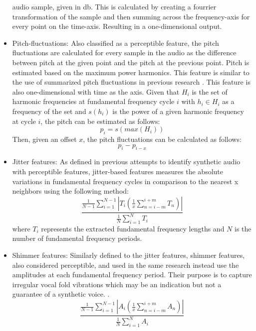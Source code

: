 \documentclass{article}
\begin{document}
\begin{itemize}
					audio sample, given in db. This is calculated by creating a fourrier
					transformation of the sample and then summing across the frequency-axis for
					every point on the time-axis. Resulting in a one-dimensional output.
				\item
					Pitch-fluctuations: Also classified as a perceptible feature, the pitch
					fluctuations are calculated for every sample in the audio as the difference
					between pitch at the given point and the pitch at the previous point. Pitch is
					estimated based on the maximum power harmonics. This feature is similar to the
					use of summarized pitch fluctuations in previous research
					\cite{khanjani_learning_2023}. This feature is also one-dimensional with time
					as the axis. Given that \(H_{i}\) is the set of harmonic frequencies at
					fundamental frequency cycle \(i\) with \(h_{i} \in H_{i}\) as a frequency of
					the set and \(s(h_{i})\) is the power of a given harmonic frequency at cycle
					\(i\), the pitch can be estimated as follows:
					\[p_{i} = s(max(H_{i}))\]
					Then, given an offset \(x\), the pitch fluctuations can be calculated as
					follows:
					\[p_{i}-p_{i-x}\]
				\item
					Jitter features: As defined in previous attempts to identify synthetic audio
					\cite{chaiwongyen_deepfake-speech_2023} with perceptible features,
					jitter-based features measures the absolute variations in fundamental
					frequency cycles in comparison to the nearest x neighbors using the following
					method:
					\[ \frac{ \frac{1}{N-1}\sum_{i=1}^{N-1}|T_{i}
						(\frac{1}{x}\sum_{n=i-m}^{i+m}T_{n})|}
					{\frac{1}{N}\sum_{i=1}^{N}T_{i}} \]
					where \(T_{i}\) represents the extracted fundamental frequency lengths and
					\(N\) is the number of fundamental frequency periods.
				\item
					Shimmer features: Similarly defined to the jitter features, shimmer features,
					also considered perceptible, and used in the same research instead use the
					amplitudes at each fundamental frequency period. Their purpose is to capture
					irregular vocal fold vibrations which may be an indication but not a guarantee
					of a synthetic voice.
					\cite{chaiwongyen_deepfake-speech_2023}.
					\[ \frac{ \frac{1}{N-1}\sum_{i=1}^{N-1}|A_{i}
						(\frac{1}{x}\sum_{n=i-m}^{i+m}A_{n})|}
					{\frac{1}{N}\sum_{i=1}^{N}A_{i}} \]
			\end{itemize}
\end{document}
